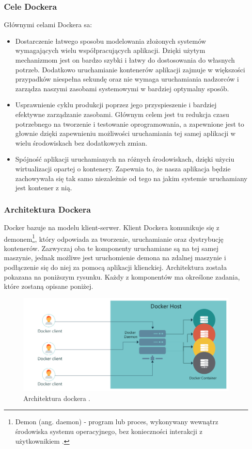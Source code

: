 \documentclass[12pt]{report}
\let\Oldsubsubsection\subsubsection
\renewcommand{\subsubsection}{\FloatBarrier\Oldsubsubsection}
\begin{document}
\subsubsection{Cele Dockera}
Głównymi celami Dockera sa:
\begin{itemize}
\item Dostarczenie łatwego sposobu modelowania złożonych systemów wymagających wielu współpracujących aplikacji. Dzięki użytym mechanizmom jest on bardzo szybki i łatwy do dostosowania do własnych potrzeb. Dodatkowo uruchamianie kontenerów aplikacji zajmuje w większości przypadków niespełna sekundę oraz nie wymaga uruchamiania nadzorców i zarządza naszymi zasobami systemowymi w bardziej optymalny sposób.

\item Usprawnienie cyklu produkcji poprzez jego przyspieszenie i bardziej efektywne zarządzanie zasobami. Głównym celem jest tu redukcja czasu potrzebnego na tworzenie i testowanie oprogramowania, a zapewnione jest to głownie dzięki zapewnieniu możliwości uruchamiania tej samej aplikacji w wielu środowiskach bez dodatkowych zmian.

\item Spójność aplikacji uruchamianych na różnych środowiskach, dzięki użyciu wirtualizacji opartej o kontenery. Zapewnia to, że nasza aplikacja będzie zachowywała się tak samo niezależnie od tego na jakim systemie uruchamiany jest kontener z nią.
\end{itemize}

\subsubsection{Architektura Dockera}
Docker bazuje na modelu klient-serwer. Klient Dockera komunikuje się z demonem\footnote{Demon (ang. daemon) - program lub proces, wykonywany wewnątrz środowiska systemu operacyjnego, bez konieczności interakcji z użytkownikiem \cite{linux}.}, który odpowiada za tworzenie, uruchamianie oraz dystrybucję kontenerów. Zazwyczaj oba te komponenty uruchamiane są na tej samej maszynie, jednak możliwe jest uruchomienie demona na zdalnej maszynie i podłączenie się do niej za pomocą aplikacji klienckiej. Architektura została pokazana na poniższym rysunku. Każdy z komponentów ma określone zadania, które zostaną opisane poniżej.

\begin{figure}[h]
	\centering
	\includegraphics[width=1\textwidth]{images/dockerArch.jpg}
	\caption{Architektura dockera \cite{dockerArchImg}.}
\end{figure}
\end{document}
